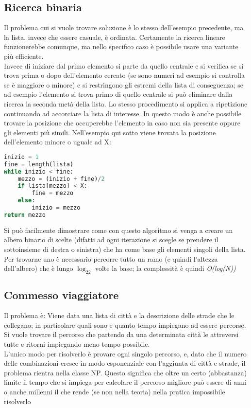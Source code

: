 \subsection{Ricerca binaria}
Il problema cui si vuole trovare soluzione è lo stesso dell'esempio precedente, ma la lista, invece che essere casuale, è ordinata. Certamente la ricerca lineare funzionerebbe comunque, ma nello specifico caso è possibile usare una variante più efficiente.\\
Invece di iniziare dal primo elemento si parte da quello centrale e si verifica se si trova prima o dopo dell'elemento cercato (se sono numeri ad esempio si controlla se è maggiore o minore) e si restringono gli estremi della lista di conseguenza; se ad esempio l'elemento si trova primo di quello centrale si può eliminare dalla ricerca la seconda metà della lista. Lo stesso procedimento si applica a ripetizione continuando ad accorciare la lista di interesse. In questo modo è anche possibile trovare la posizione che occuperebbe l'elemento in caso non sia presente oppure gli elementi più simili. Nell'esempio qui sotto viene trovata la posizione dell'elemento minore o uguale ad X:
\begin{lstlisting}[language=python]
inizio = 1
fine = length(lista)
while inizio < fine:
	mezzo = (inizio + fine)/2
	if lista[mezzo] < X:
		fine = mezzo
	else:
		inizio = mezzo
return mezzo
\end{lstlisting}
Si può facilmente dimostrare come con questo algoritmo si venga a creare un albero binario di scelte (difatti ad ogni iterazione si scegle se prendere il sottoinsieme di destra o sinistra) che ha come base gli elementi singoli della lista. Per trovarne uno è necessario percorre tutto un ramo (e quindi l'altezza dell'albero) che è lungo \textit{$\log_22$} volte la base; la complessità è quindi \textit{O(log(N))}
\subsection{Commesso viaggiatore}
Il problema è: Viene data una lista di città e la descrizione delle strade che le collegano; in particolare quali sono e quanto tempo impiegano ad essere percorse. Si vuole trovare il percorso che partendo da una determinata città le attreversi tutte e ritorni impiegando meno tempo possibile.\\
L'unico modo per risolverlo è provare ogni singolo percorso, e, dato che il numero delle combinazioni cresce in modo esponenziale con l'aggiunta di città e strade, il problema rientra nella classe NP. Questo significa che oltre un certo (abbastanza) limite il tempo che si impiega per calcolare il percorso migliore può essere di anni o anche millenni il che rende (se non nella teoria) nella pratica impossibile risolverlo

